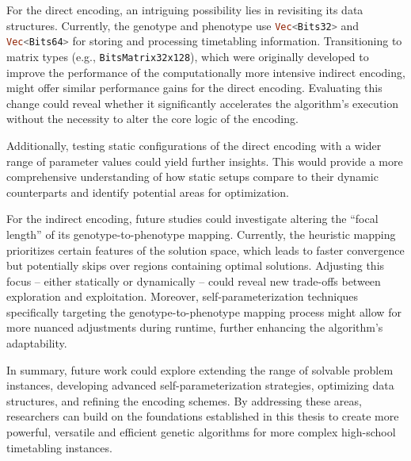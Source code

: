 \documentclass[english,examples]{isasthesis}
\begin{document}
For the direct encoding, an intriguing possibility lies in revisiting its
data structures. Currently, the genotype and phenotype use
\lstinline[language=Rust]{Vec<Bits32>} and
\lstinline[language=Rust]{Vec<Bits64>} for storing and processing timetabling
information. Transitioning to matrix types (e.g.,
\lstinline[language=Rust]{BitsMatrix32x128}), which were originally developed
to improve the performance of the computationally more intensive indirect
encoding, might offer similar performance gains for the direct encoding.
Evaluating this change could reveal whether it significantly accelerates the
algorithm's execution without the necessity to alter the core logic of the
encoding.

Additionally, testing static configurations of the direct encoding with a wider
range of parameter values could yield further insights. This would provide a
more comprehensive understanding of how static setups compare to their dynamic
counterparts and identify potential areas for optimization.

For the indirect encoding, future studies could investigate altering the
\enquote{focal length} of its genotype-to-phenotype mapping.
Currently, the heuristic mapping prioritizes certain features of the solution
space, which leads to faster convergence but potentially skips over regions
containing optimal solutions.
Adjusting this focus -- either statically or dynamically -- could reveal new
trade-offs between exploration and exploitation.
Moreover, self-parameterization techniques specifically targeting the
genotype-to-phenotype mapping process might allow for more nuanced adjustments
during runtime, further enhancing the algorithm's adaptability.

In summary, future work could explore extending the range of solvable problem
instances, developing advanced self-parameterization strategies, optimizing
data structures, and refining the encoding schemes. By addressing these
areas, researchers can build on the foundations established in this thesis
to create more powerful, versatile and efficient genetic algorithms for
more complex high-school timetabling instances.





\makedeclaration
\end{document}
